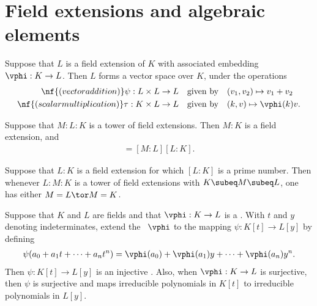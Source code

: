 \documentclass{article}
\begin{document}
\section{Field extensions and algebraic elements}
  \begin{tproposition}
    Suppose that \( L \) is a field extension of \( K \) with associated embedding \( \vphi: K \to L \).
    Then \( L \) forms a vector space over \( K \), under the operations
    \begin{align*}
      \nf{(vector addition) } \psi: L\times L &\to L \quad \text{given by} \quad (v_1,v_2) \mapsto v_1 + v_2 \\
      \nf{(scalar multiplication) } \tau : K\times  L &\to L \quad \text{given by} \quad (k,v) \mapsto \vphi(k)v.
    \end{align*}
  \end{tproposition}

  \begin{ttheorem}
    Suppose that \( M :L: K \) is a tower of field extensions.
    Then \( M : K \) is a field extension, and
    \begin{align*}
      [M : K] = [M : L][L: K].
    \end{align*}
  \end{ttheorem}

  \begin{tcorollary}
    Suppose that \( L:K \) is a field extension for which \( [L: K] \) is a prime number.
    Then whenever \( L : M : K \) is a tower of field extensions with \( K \subeq M \subeq L \), one has either \( M= L \tor M= K \).
  \end{tcorollary}

  \begin{tproposition}
    Suppose that \( K \) and \( L \) are fields and that \( \vphi : K \to L \) is a \homo. With \( t \) and \( y \) denoting indeterminates, extend the \homo~\( \vphi \) to the mapping \( \psi: K[t] \to L[y] \) by defining
    \begin{align*}
      \psi(a_0 + a_1t+\cdots + a_n t^n) = \vphi(a_0) + \vphi(a_1)y+\cdots + \vphi(a_n)y^n.
    \end{align*}
    Then \( \psi:K[t]\to L[y] \) is an injective \homo. Also, when \( \vphi:K\to L \) is surjective, then \( \psi \) is surjective and maps irreducible polynomials in \( K[t] \) to irreducible polynomials in \( L[y] \).
  \end{tproposition}
\end{document}
